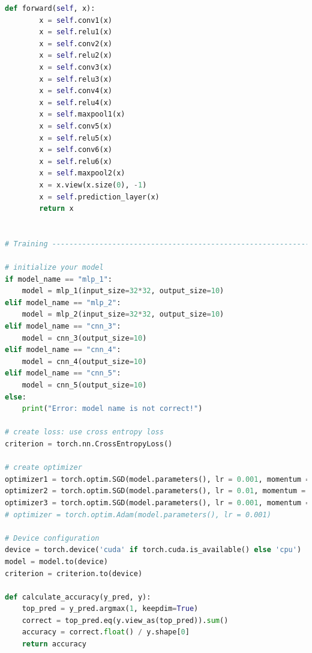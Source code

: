 \documentclass[3p,times,procedia]{elsarticle}
\begin{document}
\begin{lstlisting}[language=Python]
    def forward(self, x):
        x = self.conv1(x)
        x = self.relu1(x)
        x = self.conv2(x)
        x = self.relu2(x)
        x = self.conv3(x)
        x = self.relu3(x)
        x = self.conv4(x)
        x = self.relu4(x)
        x = self.maxpool1(x)
        x = self.conv5(x)
        x = self.relu5(x)
        x = self.conv6(x)
        x = self.relu6(x)
        x = self.maxpool2(x)
        x = x.view(x.size(0), -1)
        x = self.prediction_layer(x)
        return x


# Training --------------------------------------------------------------------------------------------------------------------------------------------#

# initialize your model
if model_name == "mlp_1":
    model = mlp_1(input_size=32*32, output_size=10)
elif model_name == "mlp_2":
    model = mlp_2(input_size=32*32, output_size=10)
elif model_name == "cnn_3":
    model = cnn_3(output_size=10)
elif model_name == "cnn_4":
    model = cnn_4(output_size=10)
elif model_name == "cnn_5":
    model = cnn_5(output_size=10)
else:
    print("Error: model name is not correct!")

# create loss: use cross entropy loss
criterion = torch.nn.CrossEntropyLoss()

# create optimizer
optimizer1 = torch.optim.SGD(model.parameters(), lr = 0.001, momentum = 0.0)
optimizer2 = torch.optim.SGD(model.parameters(), lr = 0.01, momentum = 0.0)
optimizer3 = torch.optim.SGD(model.parameters(), lr = 0.001, momentum = 0.0)
# optimizer = torch.optim.Adam(model.parameters(), lr = 0.001)

# Device configuration
device = torch.device('cuda' if torch.cuda.is_available() else 'cpu')
model = model.to(device)
criterion = criterion.to(device)

def calculate_accuracy(y_pred, y):
    top_pred = y_pred.argmax(1, keepdim=True)
    correct = top_pred.eq(y.view_as(top_pred)).sum()
    accuracy = correct.float() / y.shape[0]
    return accuracy


\end{lstlisting}
\end{document}
